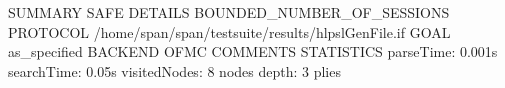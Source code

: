 SUMMARY
  SAFE
DETAILS
  BOUNDED_NUMBER_OF_SESSIONS
PROTOCOL
  /home/span/span/testsuite/results/hlpslGenFile.if
GOAL
  as_specified
BACKEND
  OFMC
COMMENTS
STATISTICS
  parseTime: 0.001s
  searchTime: 0.05s
  visitedNodes: 8 nodes
  depth: 3 plies